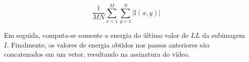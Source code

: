  \begin{equation}
	\label{eq:bandasH}
	\frac{1}{MN}\sum_{x=1}^M \sum_{y=1}^N |\mathbb{I}(x,y)|
\end{equation} 
 
 
 

 Em seguida, computa-se somente a energia do último valor de $LL$ da subimagem $I$. Finalmente, os valores de energia obtidos nos passos anteriores são concatenados em um vetor, resultando na assinatura do vídeo.






